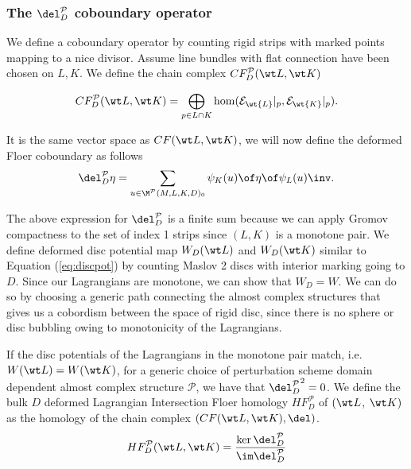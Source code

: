 \subsubsection{The $\del^{\mathcal{P}}_D$ coboundary operator}

We define a coboundary operator by counting rigid strips with marked points mapping to a nice divisor. Assume line bundles with flat connection have been chosen on $L,K$.  We define the chain complex  $CF^{\mathcal{P}}_D(\wt L, \wt K)$ 

\begin{equation*}
    CF^{\mathcal{P}}_D(\wt L, \wt K) = \bigoplus_{p\in L \cap K} \hom(\mathcal{E}_{\wt {L}}|_p,\mathcal{E}_{\wt {K}}|_p ).
\end{equation*}

\noindent It is the same vector space as $CF(\wt L,\wt K)$, we will now define the deformed Floer coboundary as follows
\begin{equation*}
    \del^{\mathcal{P}}_D \eta = \sum_{u\in \M^{\mathcal{P}}(M,L,K,D)_0}  \psi_K(u) \of \eta \of \psi_L(u)\inv.
\end{equation*}

The above expression for $\del^{\mathcal{P}}_D$ is a finite sum because we can apply Gromov compactness to the set of index 1 strips since $(L,K)$ is a monotone pair. We define deformed disc potential map $W_D(\wt L)$ and $W_D(\wt K)$ similar to Equation (\ref{eq:discpot}) by counting Maslov 2 discs with interior marking going to $D$. Since our Lagrangians are monotone, we can show that $W_D = W$. We can do so by choosing a generic path connecting the almost complex structures that gives us a cobordism between the space of rigid disc,  since there is no sphere or disc bubbling owing to monotonicity of the Lagrangians.

\begin{Theorem}

If the disc potentials of the Lagrangians in the monotone pair match, i.e.  $W(\wt L ) = W(\wt K)$, for a generic choice of perturbation scheme domain dependent almost complex structure $\mathcal{P}$, we have that ${\del^{\mathcal{P}}_D}^2=0$. We define the bulk $D$ deformed Lagrangian Intersection Floer homology $HF^{\mathcal{P}}_D$ of $(\wt L$, $\wt K)$ as the homology of the chain complex $(CF(\wt L, \wt K),\del)$. $$HF^{\mathcal{P}}_D(\wt L , \wt K) = \frac{\ker \del^{\mathcal{P}}_D }{\im \del^{\mathcal{P}}_D}$$

\end{Theorem}

